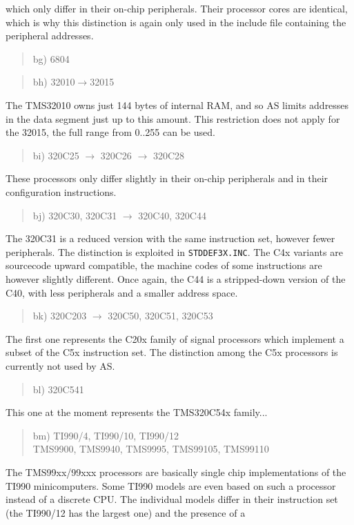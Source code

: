 \documentclass[12pt,twoside]{report}
\newcommand{\tty}[1]{{\tt #1}}
\newcommand{\asname}{{AS}}
\begin{document}
which only differ in their on-chip peripherals.  Their processor
cores are identical, which is why this distinction is again only used
in the include file containing the peripheral addresses.
\begin{quote}
bg) 6804
\end{quote}
\begin{quote}
bh) 32010$\rightarrow$32015
\end{quote}
The TMS32010 owns just 144 bytes of internal RAM, and so \asname{} limits
addresses in the data segment just up to this amount.  This restriction
does not apply for the 32015, the full range from 0..255 can be used.
\begin{quote}
bi) 320C25 $\rightarrow$ 320C26 $\rightarrow$ 320C28
\end{quote}
These processors only differ slightly in their on-chip peripherals
and in their configuration instructions.
\begin{quote}
bj) 320C30, 320C31 $\rightarrow$ 320C40, 320C44
\end{quote}
The 320C31 is a reduced version with the same instruction set,
however fewer peripherals.  The distinction is exploited in
\tty{STDDEF3X.INC}.  The C4x variants are sourcecode upward
compatible, the machine codes of some instructions are however
slightly different.  Once again, the C44 is a stripped-down
version of the C40, with less peripherals and a smaller address
space.
\begin{quote}
bk) 320C203 $\rightarrow$ 320C50, 320C51, 320C53
\end{quote}
The first one represents the C20x family of signal processors which
implement a subset of the C5x instruction set.  The distinction among the
C5x processors is currently not used by \asname{}.
\begin{quote}
bl) 320C541
\end{quote}
This one at the moment represents the TMS320C54x family...
\begin{quote}
bm) TI990/4, TI990/10, TI990/12 \\
    TMS9900, TMS9940, TMS9995, TMS99105, TMS99110
\end{quote}
The TMS99xx/99xxx processors are basically single chip implementations
of the TI990 minicomputers.  Some TI990 models are even based on such
a processor instead of a discrete CPU.  The individual models differ in their
instruction set (the TI990/12 has the largest one) and the presence of a
\end{document}
